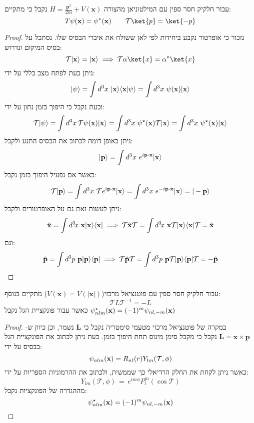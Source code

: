 \documentclass{tstextbook}
\begin{document}
\begin{proposition}
עבור חלקיק חסר ספין עם המילטוניאן מהצורה \(H={\frac{\mathbf{p}^{2}}{2m}}+V(\mathbf{x})\) נקבל כי מתקיים:
$$T\psi(\mathbf{x})=\psi^*(\mathbf{x})\qquad\mathcal{T} \ket{p} =\ket{-p} $$

\end{proposition}
\begin{proof}
נזכור כי אופרטור נקבע ביחידות לפי לאן ששולח את איברי הבסיס שלו. נסתכל על בסיס המיקום ונדרוש:
$$\mathcal{T}|\mathbf{x}\rangle=|\mathbf{x}\rangle\implies \mathcal{T} \alpha \ket{x} =\alpha^{*}\ket{x} $$
ניתן כעת לפתח מצב כללי על ידי:
$$|\psi\rangle=\int d^{3}x~|{\bf x}\rangle\langle{\bf x}|\psi\rangle=\int d^{3}x~\psi({\bf x})|{\bf x}\rangle$$
וכעת נקבל כי היפוך בזמן נתון על ידי:
$$\mathcal{T}|\psi\rangle=\int d^{3}x\,\mathcal{T}\psi({\bf x})|{\bf x}\rangle=\int d^{3}x\,\,\psi^{\star}({\bf x})\mathcal{T}|{\bf x}\rangle=\int d^{3}x\,\,\psi^{\star}({\bf x})|{\bf x}\rangle$$
ניתן באופן דומה לכתוב את הבסיס התנע ולקבל:
$$|{\bf p}\rangle=\int d^{3}x~e^{i{\bf p}\cdot{\bf x}}|{\bf x}\rangle$$
כאשר אם נפעיל היפוך בזמן נקבל:
$$\mathcal{T}|{\bf p}\rangle=\int d^{3}x~\mathcal{T} e^{i{\bf p}\cdot{\bf x}}|{\bf x}\rangle=\int d^{3}x~e^{-i{\bf p}\cdot{\bf x}}|{\bf x}\rangle=|-{\bf p}\rangle$$
ניתן לעשות זאת גם על האופרטורים ולקבל:
$$\hat{\bf x}=\int d^{3}\!x\ {\bf x}|{\bf x}\rangle\langle{\bf x}|\implies\mathcal{T}\hat{\bf x}\mathcal{T}=\int d^{3}\!x\ {\bf x}\mathcal{T}|{\bf x}\rangle\langle{\bf x}|\mathcal{T}=\hat{\bf x}$$
וגם:
$$\hat{\bf p}=\int d^{3}p\ {\bf p}|{\bf p}\rangle\langle{\bf p}|\implies\mathcal{T}\hat{\bf p}\mathcal{T}=\int d^{3}p\ {\bf p}\mathcal{T}|{\bf p}\rangle\langle{\bf p}|\mathcal{T}=-\hat{\bf p}$$

\end{proof}
\begin{corollary}
עבור חלקיק חסר ספין עם פוטנציאל מרכזי(\(V(\mathbf{x})=V(\lvert \mathbf{x} \rvert)\)) מתקיים בנוסף:
$$\mathcal{T} L\mathcal{T} ^{-1} =-L$$
כאשר עבור פונקציית הגל נקבל \(\psi_{n l m}^{\star}({\bf x})=(-1)^{m}\psi_{n l,-m}({\bf x})\)

\end{corollary}
\begin{proof}
במקרה של פוטנציאל מרכזי מטעמי סימטריה נקבל כי \(\mathbf{L}\) נשמר, וכן כיוון ש-\(\mathbf{L}=\mathbf{x}\times \mathbf{p}\) נקבל כי מקבל סימן מינוס תחת היפוך בזמן. כעת ניתן לכתוב את הפונקציית הגל בבסיס על ידי:
$$\psi_{n l m}({\bf x})=R_{n l}(r)Y_{l m}(\mathcal{T},\phi)$$
כאשר ניתן לקחת את החלק הרדיאלי כך שממשית, ולכתוב את ההרמוניות הספריות על ידי:
$$Y_{l m}(\mathcal{T},\phi)\,=\,e^{i m\phi}P_{l}^{m}(\cos\mathcal{T})$$
מההגדרה של הפונקציות נקבל:
$$\psi_{n l m}^{\star}({\bf x})=(-1)^{m}\psi_{n l,-m}({\bf x})$$

\end{proof}
\end{document}
